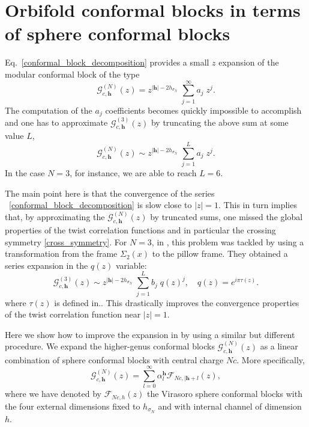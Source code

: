 \documentclass[a4paper,11pt]{article}
\begin{document}
\section{Orbifold conformal blocks in terms of sphere conformal blocks}\label{app_sphere_conf_blocks}
Eq.~\eqref{conformal_block_decomposition} provides a small $z$ expansion of the modular conformal block of the type
\begin{equation}
\mathcal{G}_{c,\boldsymbol{h}}^{(N)}(z) =z^{|\boldsymbol{h}|-2h_{\sigma_N}} \;\sum_{j=1}^{\infty} a_j \; z^j.
\end{equation}
The computation of the $a_j$ coefficients becomes quickly impossible to accomplish and one has to approximate $\mathcal{G}_{c,\boldsymbol{h}}^{(3)}(z)$ by truncating the above sum at some value $L$,
\begin{equation}
\label{trunc}
\mathcal{G}_{c,\boldsymbol{h}}^{(N)}(z) \sim z^{|\boldsymbol{h}|-2h_{\sigma_N}} \;\sum_{j=1}^{L} a_j \; z^j.
\end{equation}
In the case $N=3$, for instance, we are able to reach $L=6$.

\noindent The main point here is that the convergence of the series ~\eqref{conformal_block_decomposition} is slow close to  $|z|=1$. This in turn implies that, by approximating the $\mathcal{G}_{c,\boldsymbol{h}}^{(N)}(z)$  by truncated sums, one missed the global properties of the twist correlation functions and in particular the crossing symmetry \eqref{cross_symmetry}. 
For $N=3$, in \cite{Collier}, this problem was tackled  by using a transformation from the frame $\Sigma_2(x)$ to the pillow frame. They  obtained a series expansion in the $q(z)$ variable:
\begin{equation}
\label{collierap}
\mathcal{G}_{c,\boldsymbol{h}}^{(3)}(z) \sim z^{|\boldsymbol{h}|-2h_{\sigma_N}} \;\sum_{j=1}^{L} b_j \; q(z)^j, \quad q(z)= e^{i \pi \tau(z)}.
\end{equation}
where  $\tau(z)$ is defined in.. This drastically improves the convergence properties of the twist correlation function near $|z|=1$.

\noindent Here we show how to improve the expansion in \cite{Collier} by using a similar but different procedure.  
We expand the higher-genus conformal blocks $\mathcal{G}_{c, \boldsymbol{h}}^{(N)}(z)$ as a linear combination
of sphere conformal blocks with central charge $Nc$. More specifically,
\begin{equation}\label{expansion_sphere_conf_blocks}
 \mathcal{G}_{c, \boldsymbol{h}}^{(N)}(z)=\sum_{l=0}^\infty\alpha_l^{\boldsymbol{h}}\mathcal{F}_{Nc, |\boldsymbol{h}+l}(z),
\end{equation}
where we have  denoted by $\mathcal{F}_{Nc, h }(z)$ the Virasoro sphere conformal blocks with the four external dimensions fixed to  $h_{\sigma_N}$ and with internal channel of dimension $h$.
\end{document}
